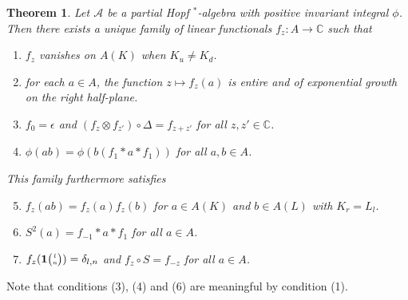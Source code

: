 \documentclass[11pt]{article}
\newcommand{\C}{\mathbb{C}}
\newcommand{\Grt}[3]{#1{\tiny {\begin{pmatrix} #2\\#3\end{pmatrix}}}}
\newcommand{\UnitC}[2]{\Grt{\mathbf{1}}{#1}{#2}}
\newtheorem{Theorem}{Theorem}[section]
\theoremstyle{definition}
\numberwithin{equation}{section}
\begin{document}
\begin{Theorem} \label{thm:rep-characters} Let $\mathscr{A}$ be a partial Hopf $^*$-algebra with positive invariant integral $\phi$.  Then there exists a unique
  family of linear functionals $f_{z} \colon A\to \C$ such that
\begin{enumerate}[label={(\arabic*)}]
  \item $f_z$ vanishes on $A(K)$ when $K_u\neq K_d$.
  \item for each $a\in A$, the function $z\mapsto f_{z}(a)$ is entire
    and of exponential growth on the right half-plane.
  \item $f_{0} = \epsilon$ and $(f_{z} \otimes f_{z'}) \circ 
    \Delta= f_{z+z'}$ for all $z,z' \in \C$.
  \item $\phi(ab)=\phi(b(f_{1} \ast a \ast f_{1}))$ for all $a,b\in A$.
  \end{enumerate}
  This family furthermore satisfies
  \begin{enumerate}[label={(\arabic*)}]\setcounter{enumi}{4}
  \item $f_z(ab) = f_z(a)f_z(b)$ for $a\in A(K)$ and $b\in A(L)$ with $K_r = L_l$. 
  \item $S^{2}(a)=f_{-1} \ast a \ast f_{1}$ for all $a\in A$.
  \item $f_{z}(\UnitC{l}{n})=\delta_{l,n}$ and $f_{z} \circ S = f_{-z}$ for all $a\in A$.
\end{enumerate}
\end{Theorem}


Note that conditions (3), (4) and (6) are meaningful by condition (1).
\end{document}
